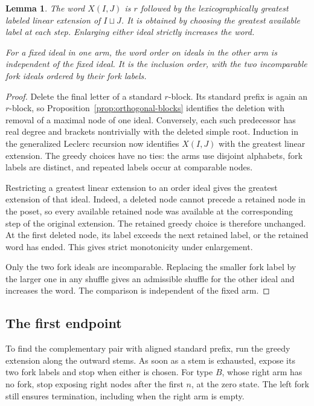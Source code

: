 \documentclass[11pt]{amsart}
\numberwithin{equation}{section}
\newtheorem{lemma}[theorem]{Lemma}
\theoremstyle{definition}
\begin{document}
\begin{lemma}\label{lem:ideal-shuffle}
The word $X(I,J)$ is $r$ followed by the lexicographically greatest labeled linear extension of $I\sqcup J$. It is obtained by choosing the greatest available label at each step. Enlarging either ideal strictly increases the word.

For a fixed ideal in one arm, the word order on ideals in the other arm is independent of the fixed ideal. It is the inclusion order, with the two incomparable fork ideals ordered by their fork labels.
\end{lemma}
\begin{proof}
Delete the final letter of a standard $r$-block. Its standard prefix is again an $r$-block, so Proposition~\ref{prop:orthogonal-blocks} identifies the deletion with removal of a maximal node of one ideal. Conversely, each such predecessor has real degree and brackets nontrivially with the deleted simple root. Induction in the generalized Leclerc recursion now identifies $X(I,J)$ with the greatest linear extension. The greedy choices have no ties: the arms use disjoint alphabets, fork labels are distinct, and repeated labels occur at comparable nodes.

Restricting a greatest linear extension to an order ideal gives the greatest extension of that ideal. Indeed, a deleted node cannot precede a retained node in the poset, so every available retained node was available at the corresponding step of the original extension. The retained greedy choice is therefore unchanged. At the first deleted node, its label exceeds the next retained label, or the retained word has ended. This gives strict monotonicity under enlargement.

Only the two fork ideals are incomparable. Replacing the smaller fork label by the larger one in any shuffle gives an admissible shuffle for the other ideal and increases the word. The comparison is independent of the fixed arm.
\end{proof}

\subsection{The first endpoint}\label{subsec:orthogonal-endpoint}
To find the complementary pair with aligned standard prefix, run the greedy extension along the outward stems. As soon as a stem is exhausted, expose its two fork labels and stop when either is chosen. For type $B$, whose right arm has no fork, stop exposing right nodes after the first $n$, at the zero state. The left fork still ensures termination, including when the right arm is empty.
\end{document}
